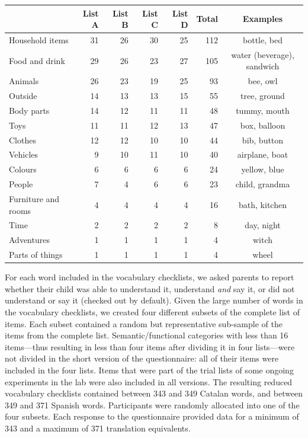 \documentclass[
  man,
  floatsintext,
  colorlinks=true,linkcolor=blue,citecolor=blue,urlcolor=blue,biblatex]{apa7}
\begin{document}
\begin{table}
\caption{Summary of the items included in the final analyses.}
\label{apatb-items}

\begin{longtable*}{l|rrrrrc}
\toprule
{} & List A & List B & List C & List D & Total & Examples \\ 
\midrule
Household items & 31 & 26 & 30 & 25 & 112 & bottle, bed \\ 
Food and drink & 29 & 26 & 23 & 27 & 105 & water (beverage), sandwich \\ 
Animals & 26 & 23 & 19 & 25 & 93 & bee, owl \\ 
Outside & 14 & 13 & 13 & 15 & 55 & tree, ground \\ 
Body parts & 14 & 12 & 11 & 11 & 48 & tummy, mouth \\ 
Toys & 11 & 11 & 12 & 13 & 47 & box, balloon \\ 
Clothes & 12 & 12 & 10 & 10 & 44 & bib, button \\ 
Vehicles & 9 & 10 & 11 & 10 & 40 & airplane, boat \\ 
Colours & 6 & 6 & 6 & 6 & 24 & yellow, blue \\ 
People & 7 & 4 & 6 & 6 & 23 & child, grandma \\ 
Furniture and rooms & 4 & 4 & 4 & 4 & 16 & bath, kitchen \\ 
Time & 2 & 2 & 2 & 2 & 8 & day, night \\ 
Adventures & 1 & 1 & 1 & 1 & 4 & witch \\ 
Parts of things & 1 & 1 & 1 & 1 & 4 & wheel \\ 
\bottomrule
\end{longtable*}

\end{table}

For each word included in the vocabulary checklists, we asked parents to
report whether their child was able to understand it, understand
\emph{and} say it, or did not understand or say it (checked out by
default). Given the large number of words in the vocabulary checklists,
we created four different subsets of the complete list of items. Each
subset contained a random but representative sub-sample of the items
from the complete list. Semantic/functional categories with less than 16
items---thus resulting in less than four items after dividing it in four
lists---were not divided in the short version of the questionnaire: all
of their items were included in the four lists. Items that were part of
the trial lists of some ongoing experiments in the lab were also
included in all versions. The resulting reduced vocabulary checklists
contained between 343 and 349 Catalan words, and between 349 and 371
Spanish words. Participants were randomly allocated into one of the four
subsets. Each response to the questionnaire provided data for a minimum
of 343 and a maximum of 371 translation equivalents.
\end{document}
